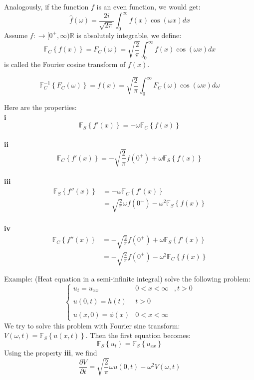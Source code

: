 \documentclass[12pt]{article} %
\begin{document}
 Analogously, if the function $f$ is an even function, we would get:
 $$
 \hat{f}(\omega) = \frac{ 2i}{\sqrt{2 \pi}}\int_{0}^{\infty} f(x) \cos(\omega x) dx 
 $$
 Assume $f: \to [0^{+}, \infty) \mathbb{R} $ is absolutely integrable, we define:
 $$
\mathbb{F}_{C}\left\{ f(x) \right\} = F_{C}(\omega) = \sqrt{\frac{2}{\pi}} \int_{0}^{\infty} f(x) \cos (\omega x) dx
$$is called the Fourier cosine transform of $f (x)$.\par
$$
\mathbb{F}_{C}^{-1}\left\{ F_{C}(\omega) \right\} =f(x) =  \sqrt{\frac{2}{\pi}} \int_{0}^{\infty} F_{C}(\omega) \cos(\omega x) d \omega
$$\par
Here are the properties:\\
\textbf{i} 
$$
\mathbb{F}_{S} \left\{ f'(x) \right\} = -\omega \mathbb{F}_{C} \left\{ f(x) \right\}
$$\\
\textbf{ii}
$$
\mathbb{F}_{C} \left\{ f'(x) \right\} = -\sqrt{\frac{2}{\pi}} f(0^{+}) + \omega \mathbb{F}_{S} \left\{ f(x) \right\}
$$ \\
\textbf{iii}
\begin{align*}
\mathbb{F}_{S} \left\{ f''(x) \right\} &= -\omega \mathbb{F}_{C} \left\{ f'(x) \right\} \\
& = \sqrt{\frac{2}{\pi}} \omega f(0^{+}) -\omega^{2} \mathbb{F}_{S} \left\{ f(x) \right\}
\end{align*} \\
\textbf{iv}
\begin{align*}
\mathbb{F}_{C} \left\{ f''(x) \right\} &= -\sqrt{\frac{2}{\pi}} f(0^{+}) + \omega \mathbb{F}_{S} \left\{ f'(x) \right\}\\
& =  -\sqrt{\frac{2}{\pi}} f(0^{+}) -\omega^{2} \mathbb{F}_{C} \left\{ f(x) \right\}
\end{align*} \par
Example: (Heat equation in a semi-infinite integral) solve the following problem:
$$
\left\{
\begin{array}{lll}
u_{t}  =  u_{xx} & 0< x < \infty &,  t >0\\
\\
u(0, t)  = h(t)  & t>0\\
\\
u(x, 0) = \phi(x) & 0< x < \infty
\end{array}\right.
$$
We try to solve this problem with Fourier sine transform: $V(\omega, t) = \mathbb{F}_{S} \left \{ u(x, t) \right \}$. Then the first equation becomes:
$$
\mathbb{F}_{S} \left \{ u_{t} \right \} = \mathbb{F}_{S} \left \{ u_{xx} \right \}
$$Using the property \textbf{iii}, we find 
$$
\frac{\partial V}{\partial t} = \sqrt{\frac{2}{\pi}} \omega u(0, t) - \omega^{2} V(\omega, t)
$$
\end{document}
